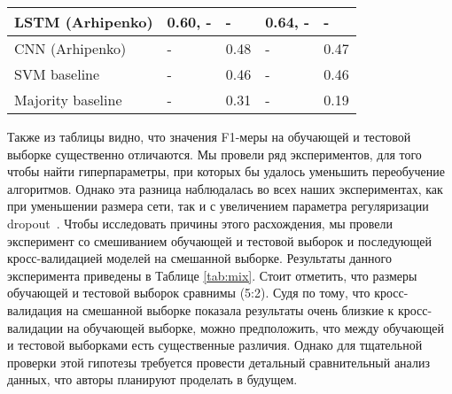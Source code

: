 \begin{table}[H]
\begin{tabular}{l|l|l|l|l|}
    \multicolumn{1}{|l|}{LSTM (Arhipenko)}                                                                        & 0.60, -               & -    & 0.64, -                                              & -                                   \\ \hline
    \multicolumn{1}{|l|}{CNN (Arhipenko)}                                                                         & -                     & 0.48 & -                                                    & 0.47                                \\ \hline
    \multicolumn{1}{|l|}{SVM baseline}                                                                            & -                     & 0.46 & -                                                    & 0.46                                \\ \hline
    \multicolumn{1}{|l|}{Majority baseline}                                                                       & -                     & 0.31 & -                                                    & 0.19                                \\ \hline
    \end{tabular}
\end{table}

Также из таблицы видно, что значения F1-меры на обучающей и тестовой выборке существенно отличаются. Мы провели ряд экспериментов, для того чтобы найти гиперпараметры, при которых бы удалось уменьшить переобучение алгоритмов. Однако эта разница наблюдалась во всех наших экспериментах, как при уменьшении размера сети, так и с увеличением параметра регуляризации dropout~\cite{srivastava}. Чтобы исследовать причины этого расхождения, мы провели эксперимент со смешиванием обучающей и тестовой выборок и последующей кросс-валидацией моделей на смешанной выборке. Результаты данного эксперимента приведены в Таблице \ref{tab:mix}. Стоит отметить, что размеры обучающей и тестовой выборок сравнимы (5:2). Судя по тому, что кросс-валидация на смешанной выборке показала результаты очень близкие к кросс-валидации на обучающей выборке, можно предположить, что между обучающей и тестовой выборками есть существенные различия. Однако для тщательной проверки этой гипотезы требуется провести детальный сравнительный анализ данных, что авторы планируют проделать в будущем.

